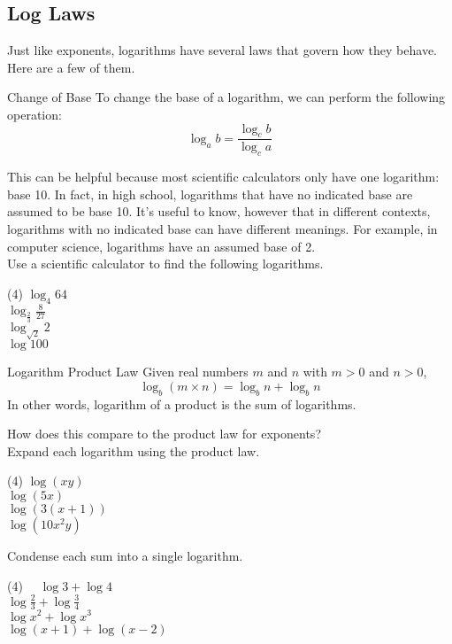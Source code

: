 \documentclass[12pt,fleqn]{book}
\begin{document}
\subsection*{Log Laws}
Just like exponents, logarithms have several laws that govern how they behave.  Here are a few of them.
\begin{thm}{Change of Base}{}
To change the base of a logarithm, we can perform the following operation:
\[
    \log_a b = \frac{\log_c b}{\log_c a}
\]
\end{thm}
This can be helpful because most scientific calculators only have one logarithm: base 10.  In fact, in high school, logarithms that have no indicated base are assumed to be base 10.  It's useful to know, however that in different contexts, logarithms with no indicated base can have different meanings.  For example, in computer science, logarithms have an assumed base of 2. 
\\[1em]
Use a scientific calculator to find the following logarithms.
\begin{tasks}(4)  
 \task $\log _4 64$  
 \\[1in]
 \task $\log _{\frac{2}{3}} \frac{8}{27}$  
 \\[1in]
 \task $\log _{\sqrt{2}} 2$  
 \\[1in]
 \task $\log 100$
 \\[1in]
\end{tasks}
\begin{thm}{Logarithm Product Law}{}
    Given real numbers $m$ and $n$ with $m>0$ and $n>0$,
\[
\log _b(m \times n)=\log _b n+\log _b n
\]
In other words, logarithm of a product is the sum of logarithms.
\end{thm}
How does this compare to the product law for exponents?
\\[1in]
Expand each logarithm using the product law.
\begin{tasks}(4)
\task $\log (x y)$
\\[1in]
\task $\log (5x)$
\\[1in]
\task $\log (3(x+1))$
\\[1in]
\task $\log (10x^2y)$
\\[1in]
\end{tasks}
Condense each sum into a single logarithm.
\begin{tasks}(4)
\task $\quad \log 3+\log 4$
\\[1in]
\task $\log \frac{2}{3}+\log \frac{3}{4}$
\\[1in]
\task $\log x^2+\log x^3$
\\[1in]
\task $\log (x+1)+\log (x-2)$
\\[1in]
\end{tasks}
\end{document}

